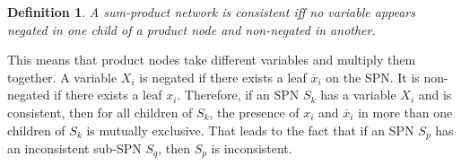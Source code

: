 \documentclass[a4paper,10pt]{article}
\theoremstyle{plain}
\newtheorem*{spn-def}{Definition}
\begin{document}
\begin{figure}[h]
\end{figure}

\begin{spn-def}
  A sum-product network is consistent iff no variable appears negated in one child of a product
  node and non-negated in another.
\end{spn-def}

This means that product nodes take different variables and multiply them together. A variable $X_i$
is negated if there exists a leaf $\overline{x}_i$ on the SPN\@. It is non-negated if there exists
a leaf $x_i$. Therefore, if an SPN $S_k$ has a variable $X_i$ and is consistent, then for all
children of $S_k$, the presence of $x_i$ and $\overline{x}_i$ in more than one children of $S_k$ is
mutually exclusive. That leads to the fact that if an SPN $S_p$ has an inconsistent sub-SPN $S_q$,
then $S_p$ is inconsistent.

\begin{figure}[h]
\end{figure}
\end{document}
